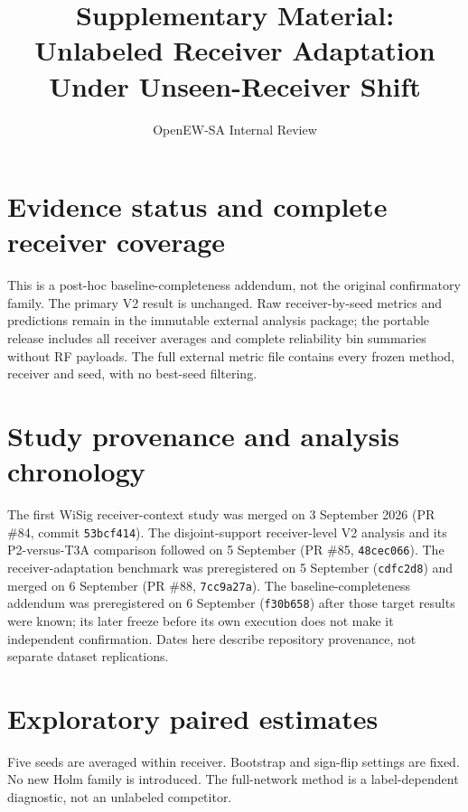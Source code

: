 \documentclass[11pt]{article}
\title{Supplementary Material: Unlabeled Receiver Adaptation Under Unseen-Receiver Shift}
\author{OpenEW-SA Internal Review}
\date{}
\begin{document}
\maketitle
\section{Evidence status and complete receiver coverage}
This is a post-hoc baseline-completeness addendum, not the original confirmatory family. The primary V2 result is unchanged. Raw receiver-by-seed metrics and predictions remain in the immutable external analysis package; the portable release includes all receiver averages and complete reliability bin summaries without RF payloads. The full external metric file contains every frozen method, receiver and seed, with no best-seed filtering.
\begin{center}\small\end{center}
\section{Study provenance and analysis chronology}
The first WiSig receiver-context study was merged on 3 September 2026 (PR \#84, commit \texttt{53bcf414}). The disjoint-support receiver-level V2 analysis and its P2-versus-T3A comparison followed on 5 September (PR \#85, \texttt{48cec066}). The receiver-adaptation benchmark was preregistered on 5 September (\texttt{cdfc2d8}) and merged on 6 September (PR \#88, \texttt{7cc9a27a}). The baseline-completeness addendum was preregistered on 6 September (\texttt{f30b658}) after those target results were known; its later freeze before its own execution does not make it independent confirmation. Dates here describe repository provenance, not separate dataset replications.
\section{Exploratory paired estimates}
Five seeds are averaged within receiver. Bootstrap and sign-flip settings are fixed. No new Holm family is introduced. The full-network method is a label-dependent diagnostic, not an unlabeled competitor.
\begin{center}\small\end{center}
\end{document}
